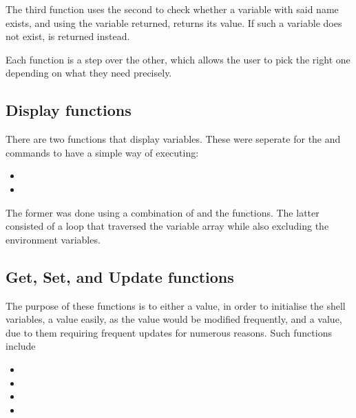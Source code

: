 \documentclass[12pt, a4paper]{report}
\begin{document}
                The third function uses the second to check whether a variable with
                said name exists, and using the variable returned, returns its value.
                If such a variable does not exist,  is returned instead.

                Each function is a step over the other, which allows the user to pick
                the right one depending on what they need precisely.

            \subsection{Display functions}
                There are two functions that display variables. These were seperate for
                the  and  commands to have a simple way of executing:

                \begin{itemize}
                    \item {}
                    \item {}
                \end{itemize}

                The former was done using a combination of  and the 
                functions. The latter consisted of a loop that traversed the variable array
                while also excluding the environment variables.
                \clearpage

            \subsection{Get, Set, and Update functions}
                The purpose of these functions is to either  a value, in
                order to initialise the shell variables,  a value easily,
                as the value would be modified frequently, and  a value,
                due to them requiring frequent updates for numerous reasons.
                Such functions include

                \begin{itemize}
                    \item {}
                    \item {}
                    \item {}
                    \item {}
                \end{itemize}
 
\end{document}
